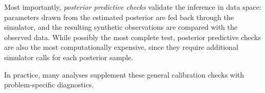 Most importantly, \emph{posterior predictive checks} validate the inference in data space: parameters drawn from the estimated posterior are fed back through the simulator, and the resulting synthetic observations are compared with the observed data.
While possibly the most complete test, posterior predictive checks are also the most computationally expensive, since they require additional simulator calls for each posterior sample.

In practice, many \SBI analyses supplement these general calibration checks with problem-specific diagnostics.

